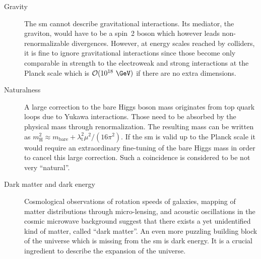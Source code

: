 \begin{description}
\item[Gravity] The \gls{sm} cannot describe gravitational interactions. Its mediator, the graviton, would have to be a spin~2 boson which however leads non-renormalizable divergences. However, at energy scales reached by colliders, it is fine to ignore gravitational interactions since those become only comparable in strength to the electroweak and strong interactions at the Planck scale which is $\mathcal{O}(10^{18}~\GeV)$ if there are no extra dimensions.
\item[Naturalness] A large correction to the bare Higgs boson mass originates from top quark loops due to Yukawa interactions. Those need to be absorbed by the physical mass through renormalization. The resulting mass can be written as $m^{2}_\mathrm{H}\approx m_\mathrm{bare}+\lambda_\mathrm{t}^{2}\mu^2/(16\pi^2)$. If the \gls{sm} is valid up to the Planck scale it would require an extraordinary fine-tuning of the bare Higgs mass in order to cancel this large correction. Such a coincidence is considered to be not very ``natural''.
\item[Dark matter and dark energy] Cosmological observations of rotation speeds of galaxies, mapping of matter distributions through micro-lensing, and acoustic oscillations in the cosmic microwave background suggest that there exists a yet unidentified kind of matter, called ``dark matter''. An even more puzzling building block of the universe which is missing from the \gls{sm} is dark energy. It is a crucial ingredient to describe the expansion of the universe.

\end{description}

